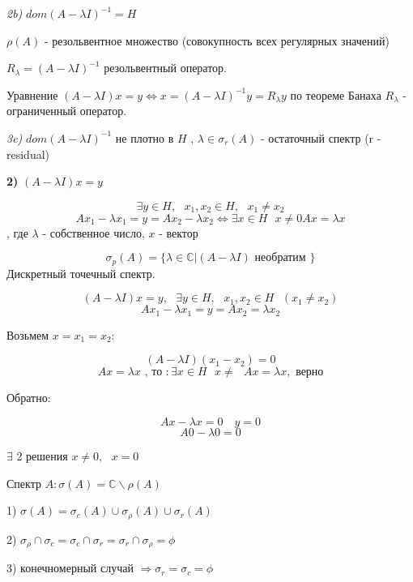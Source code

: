 \documentclass[12pt, a4paper]{report}
\begin{document}
\textit{2b)}  \( dom (A - \lambda I )^{-1 }  =H \) 


\( \rho (A) \) - резольвентное множество (совокупность всех  регулярных значений)

\( R_{\lambda } = (A  - \lambda I )^{-1 }   \) резольвентный оператор. 

Уравнение \( (A - \lambda I ) x =  y \Leftrightarrow  x = (A - \lambda I ) ^{-1 }  y = R_{\lambda } y   \) по теореме Банаха \( R_{\lambda }  \)  - ограниченный оператор. 

\textit{3c)}  \( dom (A - \lambda I )^{-1 }   \) не плотно в \( H \)  , \( \lambda \in  \sigma_{r}(A)  \) - остаточный спектр (r - residual)

\textbf{2)} \( (A - \lambda I ) x = y \) 

\[ \exists  y \in  H , \text{ }  x_1 ,x_2 \in  H , \text{ }  x_1 \neq x_2   \] 
\[ A x_1 - \lambda x_1 = y = A x_2 - \lambda x_2 \Leftrightarrow  \exists  x \in H \text{ }  x\neq 0 A x = \lambda x  \] 
, где \( \lambda  \) - собственное число, \( x \) - вектор

\[ \sigma_p(A ) = \{\lambda \in  \mathbb{C} | (A - \lambda I ) \text{ необратим }  \} \] 
Дискретный точечный спектр.

\[ (A - \lambda I ) x = y , \text{ }  \exists  y \in  H , \text{ }  x_1, x_2 \in  H \text{ } (x_1 \neq x_2 ) \] 
\[ A x_1 - \lambda x_1 = y = A x_2 = \lambda x_2  \] 

Возьмем \( x = x_1 = x_2  \):

\[  (A - \lambda I )(x_1 - x_2 ) = 0\] 
\[ A x = \lambda x \text{ , то  } : \exists  x \in  H \text{ }  x \neq \text{ }  Ax = \lambda x   ,\text{ верно} \] 

Обратно: 

\[ A x - \lambda x = 0  \quad  y = 0 \] 
\[ A 0  - \lambda 0 = 0 \] 

\( \exists   \)  2 решения \( x \neq 0 , \text{ }  x =0 \) 

\begin{definition}
    Спектр \( A : \sigma (A ) = \mathbb{C} \backslash \rho (A ) \) 

    1) \( \sigma (A ) = \sigma _{c }  (A ) \cup  \sigma_{\rho } (A ) \cup \sigma _r (A )  \) 

    2) \( \sigma _{\rho } \cap \sigma _c = \sigma _c \cap  \sigma _r = \sigma_r \cap \sigma _{\rho } = \phi    \) 

    3) конечномерный случай \( \Rightarrow \sigma_r = \sigma_c = \phi \) 
\end{definition}
\end{document}
